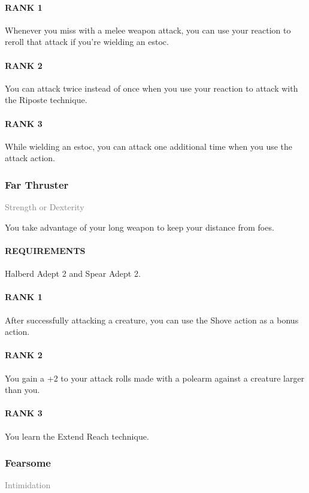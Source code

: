 \paragraph{RANK 1} Whenever you miss with a melee weapon attack, you can use your reaction to reroll that attack if you're wielding an estoc.
\paragraph{RANK 2} You can attack twice instead of once when you use your reaction to attack with the Riposte technique.
\paragraph{RANK 3} While wielding an estoc, you can attack one additional time when you use the attack action.

\subsubsection{Far Thruster} \label{tal::farthruster}
\small{\textcolor{gray}{Strength or Dexterity}}

\normalsize
You take advantage of your long weapon to keep your distance from foes.
\paragraph{REQUIREMENTS} Halberd Adept 2 and Spear Adept 2.
\paragraph{RANK 1} After successfully attacking a creature, you can use the Shove action as a bonus action.
\paragraph{RANK 2} You gain a +2 to your attack rolls made with a polearm against a creature larger than you.
\paragraph{RANK 3} You learn the Extend Reach technique.

\subsubsection{Fearsome} \label{tal::fearsome}
\small{\textcolor{gray}{Intimidation}}

